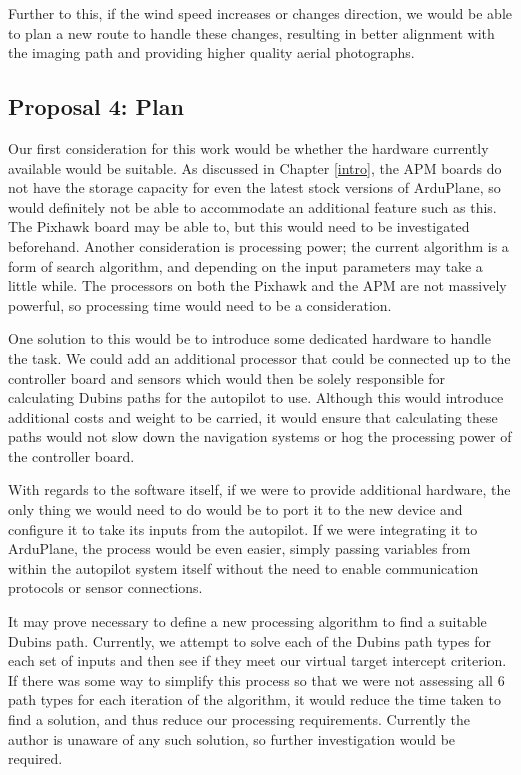 Further to this, if the wind speed increases or changes direction, we would be able to plan a new route to handle these changes, resulting in better alignment with the imaging path and providing higher quality aerial photographs. 

\subsection{Proposal 4: Plan} 
\label{future:onboardplan}

Our first consideration for this work would be whether the hardware currently available would be suitable. As discussed in Chapter \ref{intro}, the APM boards do not have the storage capacity for even the latest stock versions of ArduPlane, so would definitely not be able to accommodate an additional feature such as this. The Pixhawk board may be able to, but this would need to be investigated beforehand. Another consideration is processing power; the current algorithm is a form of search algorithm, and depending on the input parameters may take a little while. The processors on both the Pixhawk and the APM are not massively powerful, so processing time would need to be a consideration. 

One solution to this would be to introduce some dedicated hardware to handle the task. We could add an additional processor that could be connected up to the controller board and sensors which would then be solely responsible for calculating Dubins paths for the autopilot to use. Although this would introduce additional costs and weight to be carried, it would ensure that calculating these paths would not slow down the navigation systems or hog the processing power of the controller board.

With regards to the software itself, if we were to provide additional hardware, the only thing we would need to do would be to port it to the new device and configure it to take its inputs from the autopilot. If we were integrating it to ArduPlane, the process would be even easier, simply passing variables from within the autopilot system itself without the need to enable communication protocols or sensor connections. 

It may prove necessary to define a new processing algorithm to find a suitable Dubins path. Currently, we attempt to solve each of the Dubins path types for each set of inputs and then see if they meet our virtual target intercept criterion. If there was some way to simplify this process so that we were not assessing all 6 path types for each iteration of the algorithm, it would reduce the time taken to find a solution, and thus reduce our processing requirements. Currently the author is unaware of any such solution, so further investigation would be required.

